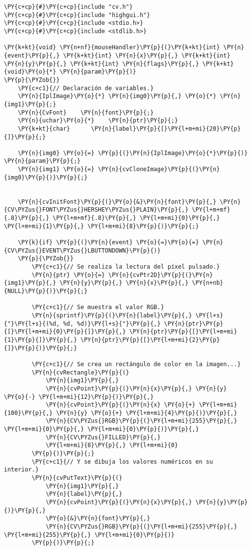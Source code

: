 \begin{Verbatim}[commandchars=\\\{\}]
\PY{c+cp}{#}\PY{c+cp}{include "cv.h"}
\PY{c+cp}{#}\PY{c+cp}{include "highgui.h"}
\PY{c+cp}{#}\PY{c+cp}{include <stdio.h>}
\PY{c+cp}{#}\PY{c+cp}{include <stdlib.h>}

\PY{k+kt}{void} \PY{n+nf}{mouseHandler}\PY{p}{(}\PY{k+kt}{int} \PY{n}{event}\PY{p}{,} \PY{k+kt}{int} \PY{n}{x}\PY{p}{,} \PY{k+kt}{int} \PY{n}{y}\PY{p}{,} \PY{k+kt}{int} \PY{n}{flags}\PY{p}{,} \PY{k+kt}{void}\PY{o}{*} \PY{n}{param}\PY{p}{)}
\PY{p}{\PYZob{}}
    \PY{c+c1}{// Declaración de variables.}
    \PY{n}{IplImage}\PY{o}{*} \PY{n}{img0}\PY{p}{,} \PY{o}{*} \PY{n}{img1}\PY{p}{;}
    \PY{n}{CvFont}    \PY{n}{font}\PY{p}{;}
    \PY{n}{uchar}\PY{o}{*}    \PY{n}{ptr}\PY{p}{;}
    \PY{k+kt}{char}      \PY{n}{label}\PY{p}{[}\PY{l+m+mi}{20}\PY{p}{]}\PY{p}{;}

    \PY{n}{img0} \PY{o}{=} \PY{p}{(}\PY{n}{IplImage}\PY{o}{*}\PY{p}{)} \PY{n}{param}\PY{p}{;}
    \PY{n}{img1} \PY{o}{=} \PY{n}{cvCloneImage}\PY{p}{(}\PY{n}{img0}\PY{p}{)}\PY{p}{;}


    \PY{n}{cvInitFont}\PY{p}{(}\PY{o}{&}\PY{n}{font}\PY{p}{,} \PY{n}{CV\PYZus{}FONT\PYZus{}HERSHEY\PYZus{}PLAIN}\PY{p}{,} \PY{l+m+mf}{.8}\PY{p}{,} \PY{l+m+mf}{.8}\PY{p}{,} \PY{l+m+mi}{0}\PY{p}{,} \PY{l+m+mi}{1}\PY{p}{,} \PY{l+m+mi}{8}\PY{p}{)}\PY{p}{;}

    \PY{k}{if} \PY{p}{(}\PY{n}{event} \PY{o}{=}\PY{o}{=} \PY{n}{CV\PYZus{}EVENT\PYZus{}LBUTTONDOWN}\PY{p}{)}
    \PY{p}{\PYZob{}}
        \PY{c+c1}{// Se realiza la lectura del píxel pulsado.}
        \PY{n}{ptr} \PY{o}{=} \PY{n}{cvPtr2D}\PY{p}{(}\PY{n}{img1}\PY{p}{,} \PY{n}{y}\PY{p}{,} \PY{n}{x}\PY{p}{,} \PY{n+nb}{NULL}\PY{p}{)}\PY{p}{;}

        \PY{c+c1}{// Se muestra el valor RGB.}
        \PY{n}{sprintf}\PY{p}{(}\PY{n}{label}\PY{p}{,} \PY{l+s}{"}\PY{l+s}{(%d, %d, %d)}\PY{l+s}{"}\PY{p}{,} \PY{n}{ptr}\PY{p}{[}\PY{l+m+mi}{0}\PY{p}{]}\PY{p}{,} \PY{n}{ptr}\PY{p}{[}\PY{l+m+mi}{1}\PY{p}{]}\PY{p}{,} \PY{n}{ptr}\PY{p}{[}\PY{l+m+mi}{2}\PY{p}{]}\PY{p}{)}\PY{p}{;}
        
        \PY{c+c1}{// Se crea un rectángulo de color en la imagen...}
        \PY{n}{cvRectangle}\PY{p}{(} 
            \PY{n}{img1}\PY{p}{,}
            \PY{n}{cvPoint}\PY{p}{(}\PY{n}{x}\PY{p}{,} \PY{n}{y} \PY{o}{-} \PY{l+m+mi}{12}\PY{p}{)}\PY{p}{,}
            \PY{n}{cvPoint}\PY{p}{(}\PY{n}{x} \PY{o}{+} \PY{l+m+mi}{100}\PY{p}{,} \PY{n}{y} \PY{o}{+} \PY{l+m+mi}{4}\PY{p}{)}\PY{p}{,}
            \PY{n}{CV\PYZus{}RGB}\PY{p}{(}\PY{l+m+mi}{255}\PY{p}{,} \PY{l+m+mi}{0}\PY{p}{,} \PY{l+m+mi}{0}\PY{p}{)}\PY{p}{,}
            \PY{n}{CV\PYZus{}FILLED}\PY{p}{,}
            \PY{l+m+mi}{8}\PY{p}{,} \PY{l+m+mi}{0}
        \PY{p}{)}\PY{p}{;}
        \PY{c+c1}{// Y se dibuja los valores numéricos en su interior.}
        \PY{n}{cvPutText}\PY{p}{(}
            \PY{n}{img1}\PY{p}{,}
            \PY{n}{label}\PY{p}{,}
            \PY{n}{cvPoint}\PY{p}{(}\PY{n}{x}\PY{p}{,} \PY{n}{y}\PY{p}{)}\PY{p}{,}
            \PY{o}{&}\PY{n}{font}\PY{p}{,}
            \PY{n}{CV\PYZus{}RGB}\PY{p}{(}\PY{l+m+mi}{255}\PY{p}{,} \PY{l+m+mi}{255}\PY{p}{,} \PY{l+m+mi}{0}\PY{p}{)}
        \PY{p}{)}\PY{p}{;}


\end{Verbatim}
